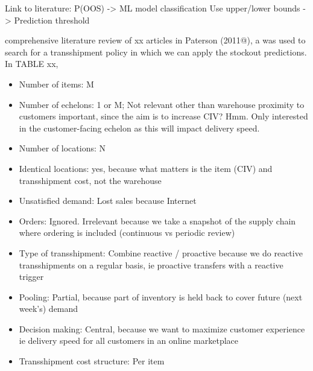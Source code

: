 \documentclass[../../main.tex]{subfiles}
\begin{document}
Link to literature:
P(OOS) -> ML model classification
Use upper/lower bounds -> Prediction threshold

comprehensive literature review of xx articles in Paterson (2011@), a  was used to search for a transshipment policy in which we can apply the stockout predictions. In TABLE xx, 

\begin{itemize}
\item Number of items: M
\item Number of echelons: 1 or M; Not relevant other than warehouse proximity to customers important, since the aim is to increase CIV? Hmm. Only interested in the customer-facing echelon as this will impact delivery speed.
\item Number of locations: N
\item Identical locations: yes, because what matters is the item (CIV) and transshipment cost, not the warehouse
\item Unsatisfied demand: Lost sales because Internet
\item Orders: Ignored. Irrelevant because we take a snapshot of the supply chain where ordering is included (continuous vs periodic review)
\item Type of transshipment: Combine reactive / proactive because we do reactive transshipments on a regular basis, ie proactive transfers with a reactive trigger
\item Pooling: Partial, because part of inventory is held back to cover future (next week's) demand
\item Decision making: Central, because we want to maximize customer experience ie delivery speed for all customers in an online marketplace
\item Transshipment cost structure: Per item
\end{itemize}




\end{document}
